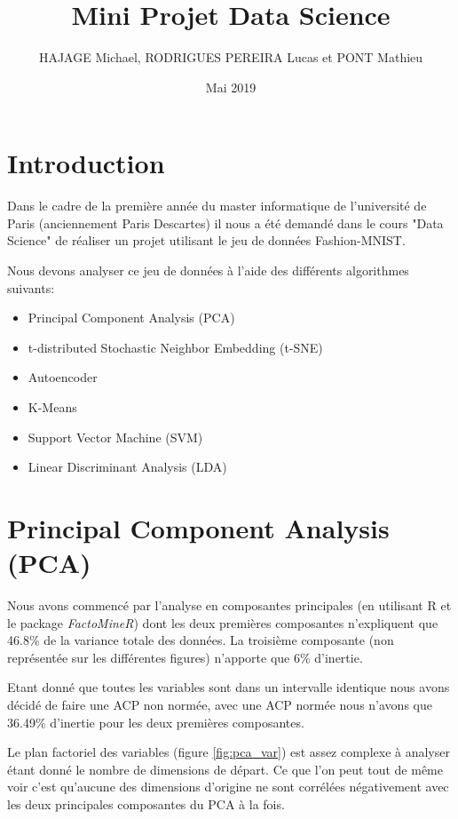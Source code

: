 \documentclass{article}
\title{Mini Projet Data Science}
\author{HAJAGE Michael, RODRIGUES PEREIRA Lucas et PONT Mathieu}
\date{Mai 2019}
\begin{document}
\maketitle

\section{Introduction}
Dans le cadre de la première année du master informatique de l'université de Paris (anciennement Paris Descartes) il nous a été demandé dans le cours "Data Science" de réaliser un projet utilisant le jeu de données Fashion-MNIST. 

Nous devons analyser ce jeu de données à l'aide des différents algorithmes suivants:

\begin{itemize}
\item Principal Component Analysis (PCA)
\item t-distributed Stochastic Neighbor Embedding (t-SNE)
\item Autoencoder
\item K-Means
\item Support Vector Machine (SVM)
\item Linear Discriminant Analysis (LDA)
\end{itemize}

\section{Principal Component Analysis (PCA)}

Nous avons commencé par l'analyse en composantes principales (en utilisant R et le package \textit{FactoMineR}) dont les deux premières composantes n'expliquent que 46.8\% de la variance totale des données. La troisième composante (non représentée sur les différentes figures) n'apporte que 6\% d'inertie.

Etant donné que toutes les variables sont dans un intervalle identique nous avons décidé de faire une ACP non normée, avec une ACP normée nous n'avons que 36.49\% d'inertie pour les deux premières composantes.

Le plan factoriel des variables (figure \ref{fig:pca_var}) est assez complexe à analyser étant donné le nombre de dimensions de départ. Ce que l'on peut tout de même voir c'est qu'aucune des dimensions d'origine ne sont corrélées négativement avec les deux principales composantes du PCA à la fois.
\end{document}
